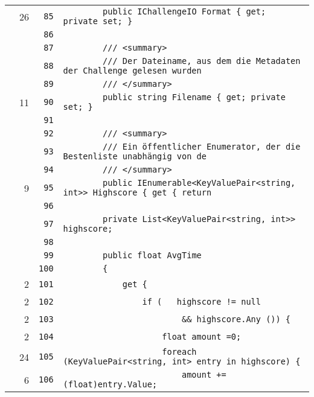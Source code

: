 \documentclass[a4paper,10pt]{article}
\begin{document}
\begin{longtable}[l]{lrrl}
\cellcolor{green} & 26 & \verb~85~ & \verb~        public IChallengeIO Format { get; private set; }~\\
\cellcolor{gray} &  & \verb~86~ & \verb~~\\
\cellcolor{gray} &  & \verb~87~ & \verb~        /// <summary>~\\
\cellcolor{gray} &  & \verb~88~ & \verb~        /// Der Dateiname, aus dem die Metadaten der Challenge gelesen wurden ~\\
\cellcolor{gray} &  & \verb~89~ & \verb~        /// </summary>~\\
\cellcolor{green} & 11 & \verb~90~ & \verb~        public string Filename { get; private set; }~\\
\cellcolor{gray} &  & \verb~91~ & \verb~~\\
\cellcolor{gray} &  & \verb~92~ & \verb~        /// <summary>~\\
\cellcolor{gray} &  & \verb~93~ & \verb~        /// Ein öffentlicher Enumerator, der die Bestenliste unabhängig von de~\\
\cellcolor{gray} &  & \verb~94~ & \verb~        /// </summary>~\\
\cellcolor{green} & 9 & \verb~95~ & \verb~        public IEnumerable<KeyValuePair<string, int>> Highscore { get { return~\\
\cellcolor{gray} &  & \verb~96~ & \verb~~\\
\cellcolor{gray} &  & \verb~97~ & \verb~        private List<KeyValuePair<string, int>> highscore;~\\
\cellcolor{gray} &  & \verb~98~ & \verb~~\\
\cellcolor{gray} &  & \verb~99~ & \verb~        public float AvgTime~\\
\cellcolor{gray} &  & \verb~100~ & \verb~        {~\\
\cellcolor{green} & 2 & \verb~101~ & \verb~            get {~\\
\cellcolor{green} & 2 & \verb~102~ & \verb~                if (   highscore != null~\\
\cellcolor{green} & 2 & \verb~103~ & \verb~                        && highscore.Any ()) {~\\
\cellcolor{green} & 2 & \verb~104~ & \verb~                    float amount =0;~\\
\cellcolor{green} & 24 & \verb~105~ & \verb~                    foreach (KeyValuePair<string, int> entry in highscore) {~\\
\cellcolor{green} & 6 & \verb~106~ & \verb~                        amount += (float)entry.Value;~\\

\end{longtable}
\end{document}
